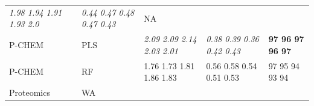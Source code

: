 \documentclass[utf8]{frontiersHLTH} %
\begin{document}
\begin{longtable}[]{@{}lllll@{}}
\begin{minipage}[t]{0.19\columnwidth}
\emph{1.98 1.94 1.91 1.93 2.0}\strut
\end{minipage} & \begin{minipage}[t]{0.19\columnwidth}\raggedright\strut
\emph{0.44 0.47 0.48 0.47 0.43}\strut
\end{minipage} & \begin{minipage}[t]{0.27\columnwidth}\raggedright\strut
NA\strut
\end{minipage}\tabularnewline
\begin{minipage}[t]{0.13\columnwidth}\raggedright\strut
P-CHEM\strut
\end{minipage} & \begin{minipage}[t]{0.08\columnwidth}\raggedright\strut
PLS\strut
\end{minipage} & \begin{minipage}[t]{0.19\columnwidth}\raggedright\strut
\emph{2.09 2.09 2.14 2.03 2.01}\strut
\end{minipage} & \begin{minipage}[t]{0.19\columnwidth}\raggedright\strut
\emph{0.38 0.39 0.36 0.42 0.43}\strut
\end{minipage} & \begin{minipage}[t]{0.27\columnwidth}\raggedright\strut
\textbf{97 96 97 96 97}\strut
\end{minipage}\tabularnewline
\begin{minipage}[t]{0.13\columnwidth}\raggedright\strut
P-CHEM\strut
\end{minipage} & \begin{minipage}[t]{0.08\columnwidth}\raggedright\strut
RF\strut
\end{minipage} & \begin{minipage}[t]{0.19\columnwidth}\raggedright\strut
1.76 1.73 1.81 1.86 1.83\strut
\end{minipage} & \begin{minipage}[t]{0.19\columnwidth}\raggedright\strut
0.56 0.58 0.54 0.51 0.53\strut
\end{minipage} & \begin{minipage}[t]{0.27\columnwidth}\raggedright\strut
97 95 94 93 94\strut
\end{minipage}\tabularnewline
\begin{minipage}[t]{0.13\columnwidth}\raggedright\strut
Proteomics\strut
\end{minipage} & \begin{minipage}[t]{0.08\columnwidth}\raggedright\strut
WA\strut
\end{minipage} & \begin{minipage}[t]{0.19\columnwidth}\raggedright\strut

\end{minipage}
\end{longtable}
\end{document}
